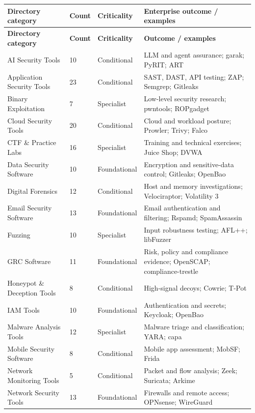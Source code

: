 \documentclass[11pt,oneside]{report}
\begin{document}
\begin{longtable}{P{0.30\textwidth}P{0.08\textwidth}P{0.18\textwidth}P{0.31\textwidth}}
\toprule \textbf{Directory category} & \textbf{Count} & \textbf{Criticality} & \textbf{Enterprise outcome / examples}\\ \midrule\endfirsthead
\toprule \textbf{Directory category} & \textbf{Count} & \textbf{Criticality} & \textbf{Outcome / examples}\\ \midrule\endhead

AI Security Tools & 10 & Conditional & LLM and agent assurance; garak; PyRIT; ART \\
Application Security Tools & 23 & Conditional & SAST, DAST, API testing; ZAP; Semgrep; Gitleaks \\
Binary Exploitation & 7 & Specialist & Low-level security research; pwntools; ROPgadget \\
Cloud Security Tools & 20 & Conditional & Cloud and workload posture; Prowler; Trivy; Falco \\
CTF \& Practice Labs & 16 & Specialist & Training and technical exercises; Juice Shop; DVWA \\
Data Security Software & 10 & Foundational & Encryption and sensitive-data control; Gitleaks; OpenBao \\
Digital Forensics & 12 & Conditional & Host and memory investigations; Velociraptor; Volatility 3 \\
Email Security Software & 13 & Foundational & Email authentication and filtering; Rspamd; SpamAssassin \\
Fuzzing & 10 & Specialist & Input robustness testing; AFL++; libFuzzer \\
GRC Software & 11 & Foundational & Risk, policy and compliance evidence; OpenSCAP; compliance-trestle \\
Honeypot \& Deception Tools & 8 & Conditional & High-signal decoys; Cowrie; T-Pot \\
IAM Tools & 10 & Foundational & Authentication and secrets; Keycloak; OpenBao \\
Malware Analysis Tools & 12 & Specialist & Malware triage and classification; YARA; capa \\
Mobile Security Software & 8 & Conditional & Mobile app assessment; MobSF; Frida \\
Network Monitoring Tools & 5 & Conditional & Packet and flow analysis; Zeek; Suricata; Arkime \\
Network Security Tools & 13 & Foundational & Firewalls and remote access; OPNsense; WireGuard \\

\end{longtable}
\end{document}

